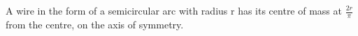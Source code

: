  A wire in the form of a semicircular arc with radius r
has its centre of mass at $ \frac{2 r}{\pi} $ from the centre,
on the axis of symmetry.
